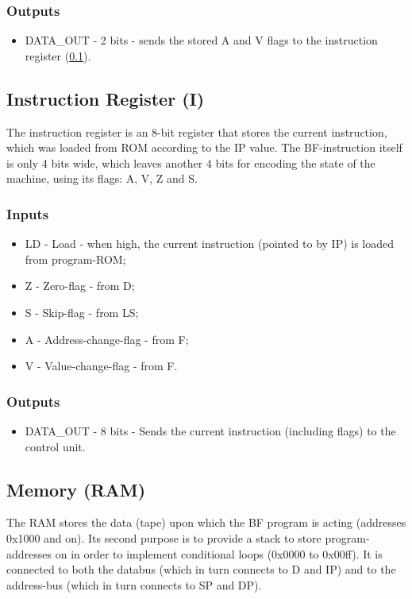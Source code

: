 \subsubsection*{Outputs}
\begin{itemize}
\item DATA\_OUT - 2 bits - sends the stored A and V flags to the instruction register (\ref{sec:architecture:i}).
\end{itemize}


\subsection{Instruction Register (I)} \label{sec:architecture:i}
The instruction register is an 8-bit register that stores the current instruction, which was loaded from ROM according to the IP value. The BF-instruction itself is only 4 bits wide, which leaves another 4 bits for encoding the state of the machine, using its flags:  A, V, Z and S.

\subsubsection*{Inputs}
\begin{itemize}
\item LD - Load - when high, the current instruction (pointed to by IP) is loaded from program-ROM;
\item Z - Zero-flag - from D;
\item S - Skip-flag - from LS;
\item A - Address-change-flag - from F;
\item V - Value-change-flag - from F.
\end{itemize}

\subsubsection*{Outputs}
\begin{itemize}
\item DATA\_OUT - 8 bits - Sends the current instruction (including flags) to the control unit.
\end{itemize}


\subsection{Memory (RAM)}  \label{sec:architecture:ram}
The RAM stores the data (tape) upon which the BF program is acting (addresses 0x1000 and on). Its second purpose is to provide a stack to store program-addresses on in order to implement conditional loops (0x0000 to 0x00ff). It is connected to both the databus (which in turn connects to D and IP) and to the address-bus (which in turn connects to SP and DP).

